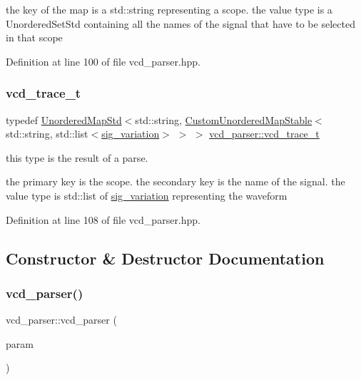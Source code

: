 the key of the map is a std\+::string representing a scope. the value type is a Unordered\+Set\+Std containing all the names of the signal that have to be selected in that scope 

Definition at line 100 of file vcd\+\_\+parser.\+hpp.

\mbox{\label{classvcd__parser_a84b85cb9df5165fca362a9da87c5a02f}} 
\subsubsection{\texorpdfstring{vcd\+\_\+trace\+\_\+t}{vcd\_trace\_t}}
{\footnotesize\ttfamily typedef \hyperlink{custom__map_8hpp_af22b2f058635373912f810498e5b1052}{Unordered\+Map\+Std}$<$std\+::string, \hyperlink{custom__map_8hpp_a7314a7df1cdb3a3acf478ab86e95c226}{Custom\+Unordered\+Map\+Stable}$<$std\+::string, std\+::list$<$\hyperlink{structsig__variation}{sig\+\_\+variation}$>$ $>$ $>$ \hyperlink{classvcd__parser_a84b85cb9df5165fca362a9da87c5a02f}{vcd\+\_\+parser\+::vcd\+\_\+trace\+\_\+t}}



this type is the result of a parse. 

the primary key is the scope. the secondary key is the name of the signal. the value type is std\+::list of \hyperlink{structsig__variation}{sig\+\_\+variation} representing the waveform 

Definition at line 108 of file vcd\+\_\+parser.\+hpp.



\subsection{Constructor \& Destructor Documentation}
\mbox{\label{classvcd__parser_afb44b21eb8fb3e809277f73f4456dc1d}} 
\subsubsection{\texorpdfstring{vcd\+\_\+parser()}{vcd\_parser()}}
{\footnotesize\ttfamily vcd\+\_\+parser\+::vcd\+\_\+parser (\begin{DoxyParamCaption}\item[{const \hyperlink{Parameter_8hpp_a37841774a6fcb479b597fdf8955eb4ea}{Parameter\+Const\+Ref} \&}]{param }\end{DoxyParamCaption})\hspace{0.3cm}{\ttfamily [explicit]}}



